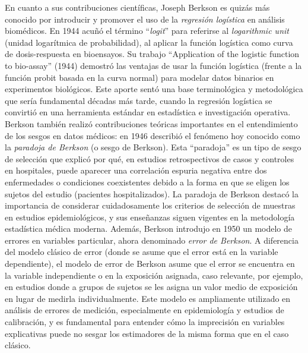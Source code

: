 \documentclass[12pt]{article}
\begin{document}
En cuanto a sus contribuciones científicas, Joseph Berkson es quizás más conocido por introducir y promover el uso de la \emph{regresión logística} en análisis biomédicos. En 1944 acuñó el término “\emph{logit}” para referirse al \emph{logarithmic unit} (unidad logarítmica de probabilidad), al aplicar la función logística como curva de dosis-respuesta en bioensayos. Su trabajo “Application of the logistic function to bio-assay” (1944) demostró las ventajas de usar la función logística (frente a la función probit basada en la curva normal) para modelar datos binarios en experimentos biológicos. Este aporte sentó una base terminológica y metodológica que sería fundamental décadas más tarde, cuando la regresión logística se convirtió en una herramienta estándar en estadística e investigación operativa. Berkson también realizó contribuciones teóricas importantes en el entendimiento de los sesgos en datos médicos: en 1946 describió el fenómeno hoy conocido como la \emph{paradoja de Berkson} (o sesgo de Berkson). Esta “paradoja” es un tipo de sesgo de selección que explicó por qué, en estudios retrospectivos de casos y controles en hospitales, puede aparecer una correlación espuria negativa entre dos enfermedades o condiciones coexistentes debido a la forma en que se eligen los sujetos del estudio (pacientes hospitalizados). La paradoja de Berkson destacó la importancia de considerar cuidadosamente los criterios de selección de muestras en estudios epidemiológicos, y sus enseñanzas siguen vigentes en la metodología estadística médica moderna. Además, Berkson introdujo en 1950 un modelo de errores en variables particular, ahora denominado \emph{error de Berkson}. A diferencia del modelo clásico de error (donde se asume que el error está en la variable dependiente), el modelo de error de Berkson asume que el error se encuentra en la variable independiente o en la exposición asignada, caso relevante, por ejemplo, en estudios donde a grupos de sujetos se les asigna un valor medio de exposición en lugar de medirla individualmente. Este modelo es ampliamente utilizado en análisis de errores de medición, especialmente en epidemiología y estudios de calibración, y es fundamental para entender cómo la imprecisión en variables explicativas puede no sesgar los estimadores de la misma forma que en el caso clásico.
\end{document}
